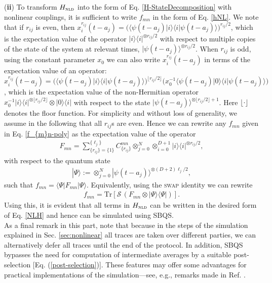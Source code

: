 \documentclass[aps,pra,twocolumn,floatfix,groupedaddress,superscriptaddress,nofootinbib,notitlepage]{revtex4-2}
\begin{document}
(\textbf{ii}) To transform $H_{\textsc{nld}}$ into the form of Eq. \eqref{H-StateDecomposition} with nonlinear couplings, it is sufficient to write $f_{mn}$ in the form of Eq. \eqref{hNL}. We note that if $r_{ij}$ is even, then $x_{i}^{r_{ij}}(t-a_{j})=\big(\langle \psi(t-a_{j})|i \rangle\langle i|\psi(t-a_{j}) \rangle\big)^{r_{ij}/2}$, which is the expectation value of the operator $|i\rangle\langle i|^{\otimes r_{ij}/2}$ with respect to multiple copies of the state of the system at relevant times, $|\psi(t-a_{j})\rangle^{\otimes r_{ij}/2}$. When $r_{ij}$ is odd, using the constant parameter $x_{0}$ we can also write $x_{i}^{r_{ij}}(t-a_{j})$ in terms of the expectation value of an operator: $x_{i}^{r_{ij}}(t-a_{j})= \big(\langle \psi(t-a_{j})|i \rangle\langle i|\psi(t-a_{j})\rangle\big)^{\lfloor {r_{ij}}/{2} \rfloor} \big(x_{0}^{-1}\langle \psi(t-a_{j})|0 \rangle\langle i|\psi(t-a_{j})\rangle\big)$, which is the expectation value of the non-Hermitian operator 
$x_{0}^{-1}|i\rangle\langle i|^{ \otimes\lfloor r_{ij}/2\rfloor}\otimes |0\rangle\langle i|$ with respect to the state $|\psi(t-a_{j}) \rangle^{\otimes\lfloor r_{ij}/2\rfloor+1}$. Here $\lfloor \cdot \rfloor$ denotes the floor function. For simplicity and without loss of generality, we assume in the following that all $r_{ij}$s are even. Hence we can rewrite any $f_{mn}$ given in Eq. \eqref{f_{m}n-poly} as the expectation value of the operator 
\begin{align}
F_{mn}=\textstyle{\sum}_{\{r_{ij}\}=\{1\}}^{\{\ell_{j}\}} C^{mn}_{\{r_{ij}\}} \textstyle{\otimes_{j=0}^{N} \otimes_{i=0}^{D+1} }  | i\rangle\langle i|^{\otimes r_{ij}/2},
\end{align}
with respect to the quantum state
\begin{align}
\label{Psi}
|\Psi\rangle:=\textstyle{\otimes}_{j=0}^{N} |\psi(t-a_{j}) \rangle^{\otimes  (D+2) \ell_{j}/2},
\end{align}
such that $f_{mn}=\langle\Psi|F_{mn}|\Psi \rangle$. Equivalently, using the \textsc{swap} identity we can rewrite 
\begin{align}
f_{mn}=\mathrm{Tr}[\mathcal{S}\,(F_{mn}\otimes|\Psi \rangle\langle\Psi|)].
\end{align}
Using this, it is evident that all terms in $H_{\textsc{nld}}$ can be written in the desired form of Eq. \eqref{NLH} and hence can be simulated using SBQS.\\ 

As a final remark in this part, note that because in the steps of the simulation explained in Sec. \ref{sec:nonlinear} all traces are taken over different parties, we can alternatively defer all traces until the end of the protocol. In addition, SBQS bypasses the need for computation of intermediate averages by a suitable post-selection [Eq. (\ref{post-selection})]. These features may offer some advantages for practical implementations of the simulation---see, e.g., remarks made in Ref. \cite{Molmer-NME2}.
\end{document}
